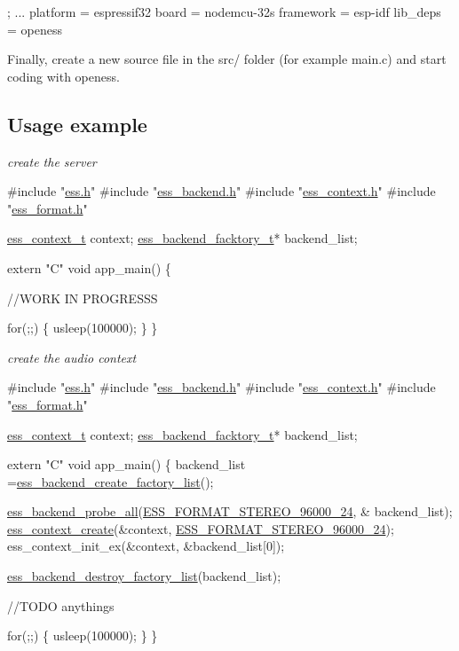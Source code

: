 \begin{DoxyCode}
; ...
platform = espressif32
board = nodemcu-32s
framework = esp-idf
lib\_deps = openess
\end{DoxyCode}
 Finally, create a new source file in the {\ttfamily src/} folder (for example {\ttfamily main.\+c}) and start coding with openess.

\subsection*{Usage example}

{\itshape create the server} 
\begin{DoxyCode}
\textcolor{preprocessor}{#include "\hyperlink{ess_8h}{ess.h}"}
\textcolor{preprocessor}{#include "\hyperlink{ess__backend_8h}{ess\_backend.h}"}
\textcolor{preprocessor}{#include "\hyperlink{ess__context_8h}{ess\_context.h}"}
\textcolor{preprocessor}{#include "\hyperlink{ess__format_8h}{ess\_format.h}"}



\hyperlink{structess__context}{ess\_context\_t} context;
\hyperlink{structess__backend}{ess\_backend\_facktory\_t}* backend\_list;

\textcolor{keyword}{extern} \textcolor{stringliteral}{"C"} \textcolor{keywordtype}{void} app\_main() \{

  \textcolor{comment}{//WORK IN PROGRESSS}


  \textcolor{keywordflow}{for}(;;) \{ usleep(100000); \}
\}
\end{DoxyCode}
 {\itshape create the audio context} 
\begin{DoxyCode}
\textcolor{preprocessor}{#include "\hyperlink{ess_8h}{ess.h}"}
\textcolor{preprocessor}{#include "\hyperlink{ess__backend_8h}{ess\_backend.h}"}
\textcolor{preprocessor}{#include "\hyperlink{ess__context_8h}{ess\_context.h}"}
\textcolor{preprocessor}{#include "\hyperlink{ess__format_8h}{ess\_format.h}"}



\hyperlink{structess__context}{ess\_context\_t} context;
\hyperlink{structess__backend}{ess\_backend\_facktory\_t}* backend\_list;

\textcolor{keyword}{extern} \textcolor{stringliteral}{"C"} \textcolor{keywordtype}{void} app\_main() \{
  backend\_list =\hyperlink{ess__backend_8h_a16cb59b090351d9b9989de80b8bad520}{ess\_backend\_create\_factory\_list}();

  \hyperlink{ess__backend_8h_ae425d7c64cceee74831168327d858fed}{ess\_backend\_probe\_all}(\hyperlink{ess__format_8h_a58e799cbd00d4340e368ec3a52bd187d}{ESS\_FORMAT\_STEREO\_96000\_24},  &
      backend\_list);
  \hyperlink{ess__context_8h_ab878ad831da78e331d88c591ff8dcc85}{ess\_context\_create}(&context, \hyperlink{ess__format_8h_a58e799cbd00d4340e368ec3a52bd187d}{ESS\_FORMAT\_STEREO\_96000\_24});
  ess\_context\_init\_ex(&context, &backend\_list[0]);

  \hyperlink{ess__backend_8h_ab6129a1d1c11f81718f9122facfddd35}{ess\_backend\_destroy\_factory\_list}(backend\_list);

  \textcolor{comment}{//TODO anythings}


  \textcolor{keywordflow}{for}(;;) \{ usleep(100000); \}
\}
\end{DoxyCode}
